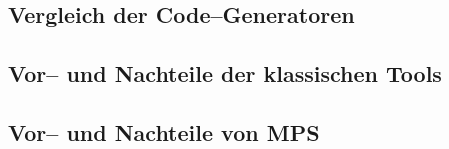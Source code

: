 \subsection{Vergleich der Code--Generatoren}\label{subsec:vergleich-der-code--generatoren}
\lipsum[5]

\subsection{Vor-- und Nachteile der klassischen Tools}\label{subsec:vor---und-nachteile-der-klassischen-tools}
\lipsum[5]

\subsection{Vor-- und Nachteile von \acs{MPS}}\label{subsec:vor---und-nachteile-von-mps}
\lipsum[5]
